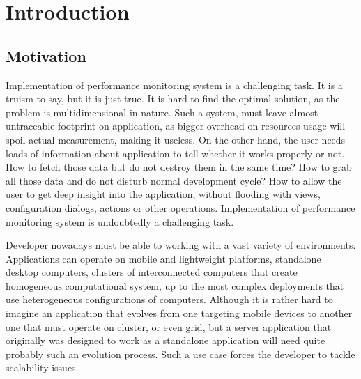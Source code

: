%
\chapter{Introduction}
\label{cha:intro}



\section{Motivation}
\label{ch1:Motivation}

Implementation of performance monitoring system is a challenging task. It is a truism to say, but it is just true. It is hard to find the optimal solution, as the problem is multidimensional in nature. Such a system, must leave almost untraceable footprint on application, as bigger overhead on resources usage will spoil actual measurement, making it useless. On the other hand, the user needs loads of information about application to tell whether it works properly or not. How to fetch those data but do not destroy them in the same time? How to grab all those data and do not disturb normal development cycle? How to allow the user to get deep insight into the application, without flooding with views, configuration dialogs, actions or other operations. Implementation of performance monitoring system is undoubtedly a challenging task.

Developer nowadays must be able to working with a vast variety of environments. Applications can operate on mobile and lightweight platforms, standalone desktop computers, clusters of interconnected computers that create homogeneous computational system, up to the most complex deployments that use heterogeneous configurations of computers. Although it is rather hard to imagine an application that evolves from one targeting mobile devices to another one that must operate on cluster, or even grid, but a server application that originally was designed to work as a standalone application will need quite probably such an evolution process. Such a use case forces the developer to tackle scalability issues.

